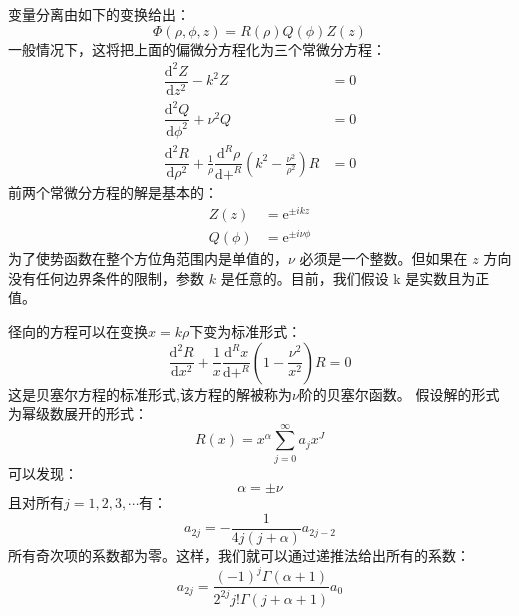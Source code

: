 \documentclass[lang=cn,10pt,newtx,bibend=biber,device=pad]{elegantbook}
\newcommand{\ee}{\mathrm{e}}
\newcommand{\deri}[3]{\dfrac{\mathrm{d}^{#1}#2}{\mathrm{d}#3^{#1}}}%
\begin{document}
变量分离由如下的变换给出：
\begin{equation}\label{eq:3.72}
    \Phi(\rho,\phi,z) = R(\rho) Q(\phi) Z(z)
\end{equation}
一般情况下，这将把上面的偏微分方程化为三个常微分方程：
\begin{equation}\label{eq:3.73}
    \begin{aligned}
        \deri{2}{Z}{z}-k^2Z &= 0 \\
        \deri{2}{Q}{\phi}+\nu^2Q &= 0 \\
        \deri{2}{R}{\rho}+\frac{1}{\rho}\deri{R}{\rho}+\left(k^2-\frac{\nu^2}{\rho^2}\right)R &= 0
    \end{aligned}
\end{equation}
前两个常微分方程的解是基本的：
\begin{equation}\label{eq:3.74}
    \begin{aligned}
        Z(z)&=\ee^{\pm ikz} \\
        Q(\phi)&=\ee^{\pm i\nu\phi}
    \end{aligned}
\end{equation}
为了使势函数在整个方位角范围内是单值的，$\nu$ 必须是一个整数。但如果在 $z$ 方向没有任何边界条件的限制，参数 $k$ 是任意的。目前，我们假设 k 是实数且为正值。

径向的方程可以在变换$x=k\rho$下变为标准形式：
\begin{equation}\label{eq:3.75}
    \deri{2}{R}{x}+\frac{1}{x}\deri{R}{x}+\left(1-\frac{\nu^2}{x^2}\right)R=0
\end{equation}
这是贝塞尔方程的标准形式,该方程的解被称为$\nu$阶的贝塞尔函数。
假设解的形式为幂级数展开的形式：
\begin{equation}\label{eq:3.76}
    R(x)=x^\alpha\sum_{j=0}^{\infty}a_jx^J
\end{equation}
可以发现：
\begin{equation}\label{eq:3.77}
    \alpha = \pm \nu
\end{equation}
且对所有$j=1,2,3,\cdots$有：
\begin{equation}\label{eq:3.78}
    a_{2j}=-\frac{1}{4j(j+\alpha)}a_{2j-2}
\end{equation}
所有奇次项的系数都为零。这样，我们就可以通过递推法给出所有的系数：
\begin{equation}
    a_{2j}=\frac{(-1)^j\Gamma(\alpha+1)}{2^{2j}j!\Gamma(j+\alpha+1)}a_0
\end{equation}
\end{document}
